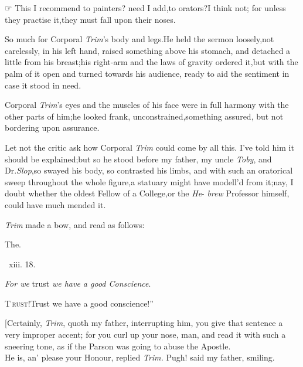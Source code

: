 \documentclass{article}
\begin{document}
☞ This I recommend to painters?\tsk\break
need I add,\tsk to orators?\tsk I think not;\break
for unless they practise it,\tsh they must\break
fall upon their noses.

So much for Corporal \textit{Trim}’s body and
legs.\tsk He held the sermon loosely,\tsk not carelessly, in
his left hand, raised something above his stomach, and detached a
little from his breast;\tsh his right-arm
and the laws of gravity ordered
it,\tsh but with the palm of it open and turned towards
his audience, ready to aid the sentiment in case it stood in
need.

Corporal \textit{Trim}’s eyes and the muscles of his face
were in full harmony with the other parts of him;\tsk he looked
frank,\tsk\break
unconstrained,\tsk something assured,\tsh\break
but not bordering upon assurance.

Let not the critic ask how Corporal \textit{Trim} could come by
all this. I’ve told him it should be explained;\tsk but so he
stood before my father, my uncle \textit{Toby}, and Dr.\@ \textit{Slop},\tsk so swayed his body, so contrasted his limbs, and
with such an oratorical sweep throughout the whole
figure,\tsh a statuary might have modell’d from
it;\tsh nay, I doubt whether the oldest Fellow of a
College,\tsk or the \textit{He}-
\textit{brew} Professor himself, could have
much mended it.

\textit{Trim} made a bow, and read as follows:

\bigskip
\centerline{The\quad {}.}
\bigskip
\centerline{\, xiii. 18.}
\tsh \textit{For we} trust \textit{we have a good
Conscience}.\tsh

\lettrine{\lower-12pt\hbox{\normalsize \lqq }T}{\,rust!}\tsh Trust we have a good conscience!”

[Certainly, \textit{Trim}, quoth my father, interrupting him, you
give that sentence a very improper accent; for you curl up your
nose, man, and read it with such a sneering tone, as if the Parson
was going to abuse the Apostle.\\
\newpage
He is, an’ please your Honour, replied \textit{Trim.} Pugh!
said my father, smiling.
\end{document}
